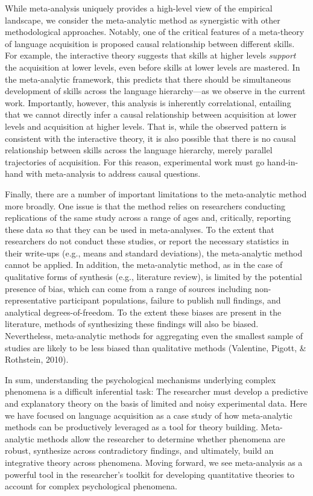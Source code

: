 \documentclass[english,floatsintext,man]{apa6}
\theoremstyle{definition}
\theoremstyle{definition}
\theoremstyle{remark}
\begin{document}
While meta-analysis uniquely provides a high-level view of the empirical
landscape, we consider the meta-analytic method as synergistic with
other methodological approaches. Notably, one of the critical features
of a meta-theory of language acquisition is proposed causal relationship
between different skills. For example, the interactive theory suggests
that skills at higher levels \emph{support} the acquisition at lower
levels, even before skills at lower levels are mastered. In the
meta-analytic framework, this predicts that there should be simultaneous
development of skills across the language hierarchy---as we observe in
the current work. Importantly, however, this analysis is inherently
correlational, entailing that we cannot directly infer a causal
relationship between acquisition at lower levels and acquisition at
higher levels. That is, while the observed pattern is consistent with
the interactive theory, it is also possible that there is no causal
relationship between skills across the language hierarchy, merely
parallel trajectories of acquisition. For this reason, experimental work
must go hand-in-hand with meta-analysis to address causal questions.

Finally, there are a number of important limitations to the
meta-analytic method more broadly. One issue is that the method relies
on researchers conducting replications of the same study across a range
of ages and, critically, reporting these data so that they can be used
in meta-analyses. To the extent that researchers do not conduct these
studies, or report the necessary statistics in their write-ups (e.g.,
means and standard deviations), the meta-analytic method cannot be
applied. In addition, the meta-analytic method, as in the case of
qualitative forms of synthesis (e.g., literature review), is limited by
the potential presence of bias, which can come from a range of sources
including non-representative participant populations, failure to publish
null findings, and analytical degrees-of-freedom. To the extent these
biases are present in the literature, methods of synthesizing these
findings will also be biased. Nevertheless, meta-analytic methods for
aggregating even the smallest sample of studies are likely to be less
biased than qualitative methods (Valentine, Pigott, \& Rothstein, 2010).

In sum, understanding the psychological mechanisms underlying complex
phenomena is a difficult inferential task: The researcher must develop a
predictive and explanatory theory on the basis of limited and noisy
experimental data. Here we have focused on language acquisition as a
case study of how meta-analytic methods can be productively leveraged as
a tool for theory building. Meta-analytic methods allow the researcher
to determine whether phenomena are robust, synthesize across
contradictory findings, and ultimately, build an integrative theory
across phenomena. Moving forward, we see meta-analysis as a powerful
tool in the researcher's toolkit for developing quantitative theories to
account for complex psychological phenomena.
\end{document}
